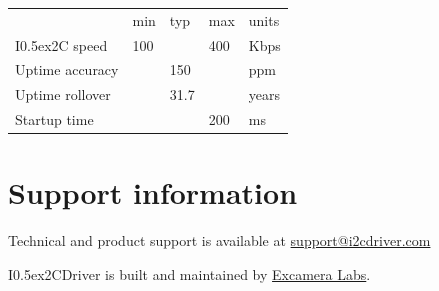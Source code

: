 \documentclass{article}
\newcommand{\two}{\raise0.5ex\hbox{\footnotesize{2}}}
\newcommand{\iic}{I\two{}C}
\newcommand{\iicdriver}{I\two{}CDriver}
\newcommand{\heavyline}{\specialrule{1pt}{1pt}{1pt}}
\begin{document}
{\renewcommand{\arraystretch}{1.2}%
\begin{tabularx}{\linewidth}{XC{40pt}C{40pt}C{40pt}C{40pt}}
\heavyline
& min & typ & max & units \\ \heavyline

\iic{} speed                     &100& &400& Kbps   \\ \hline {}
Uptime accuracy               && 150 && ppm           \\ \hline
Uptime rollover               && 31.7 && years        \\ \hline
Startup time & & & 200 & ms \\ \hline
\end{tabularx}}
\vspace{10 pt}

\section{Support information}

Technical and product support is available at
\href{mailto:support@i2cdriver.com}{support@i2cdriver.com}

\iicdriver{} is built and maintained by
\href{https://excamera.com}{Excamera Labs}.

\newpage
{}
\renewcommand{\indexname}{Index}
\printindex
\end{document}
